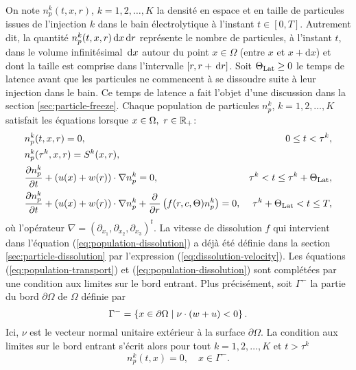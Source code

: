On note $n_p^k(t, x, r)$, $k = 1, 2, \dots, K$ la densité en espace et
en taille de particules issues de l'injection $k$ dans le bain
électrolytique à l'instant $t \in [0, T]$. Autrement dit, la quantité
$n_p^k(t, x, r)\,\mathrm dx\,\mathrm dr$ représente le nombre de particules, à
l'instant $t$, dans le volume infinitésimal $\,\mathrm dx$ autour du point
$x\in\Omega$ (entre $x$ et $x + \mathrm dx$) et dont la taille est comprise dans l'intervalle $[r,
  r+\,\mathrm dr]$. Soit $\Theta_\text{Lat} \geq 0$ le temps de latence avant que les
particules ne commencent à se dissoudre suite à leur injection dans le
bain. Ce temps de latence a fait l'objet d'une discussion dans la
section \ref{sec:particle-freeze}. Chaque population de particules
$n_p^k$, $k = 1, 2,\dots, K$ satisfait les
équations lorsque $x\in\Omega,\ r\in\rplus$:
\begin{align}
  &n_p^k(t, x, r) = 0, & 0\leq t < \tau^k,\label{eq:population-pre-injection}\\
  &n_p^k(\tau^k, x, r) = S^k(x, r),\label{eq:population-injection}\\
  &\frac{\partial n_p^k}{\partial t} + (u(x) + w(r))\cdot \nabla n_p^k
  = 0, &\tau^k < t \leq \tau^k +
  \Theta_\text{Lat},\label{eq:population-transport}\\
  &\frac{\partial n_p^k}{\partial t} + (u(x) + w(r))\cdot \nabla n_p^k
  + \frac{\partial}{\partial r} \left( f(r, c,
    \Theta) n_p^k \right) = 0, &\tau^k + \Theta_\text{Lat} < t \leq T,\label{eq:population-dissolution}
\end{align}
où l'opérateur $\nabla = (\partial_{x_1}, \partial_{x_2},
\partial_{x_3})^t$. La vitesse de dissolution $f$ qui intervient dans
l'équation (\ref{eq:population-dissolution}) a déjà été définie dans
la section \ref{sec:particle-dissolution} par l'expression
(\ref{eq:dissolution-velocity}). Les équations
(\ref{eq:population-transport}) et (\ref{eq:population-dissolution})
sont complétées par une condition aux limites sur le bord entrant. Plus
précisément, soit $\Gamma^-$ la partie du bord $\partial \Omega$ de $\Omega$
définie par
\begin{equation}\label{eq:np-bc}
  \Gamma^- = \left\{ x\in\partial\Omega \mid \nu \cdot  (w + u)
  < 0 \right\}.
\end{equation}
Ici, $\nu$ est le vecteur normal unitaire extérieur à la surface
$\partial \Omega$. La condition aux limites sur le bord entrant s'écrit
alors pour tout $k = 1, 2, \dots, K$ et $t > \tau^k$
\begin{equation}
n_p^k(t, x) = 0, \quad x\in\Gamma^-.
\end{equation}

